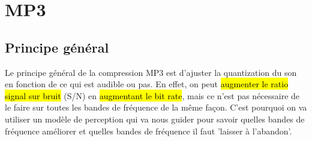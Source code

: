 \documentclass[letterpaper, 12pt]{article}
\newcommand{\alinea}{
\hspace*{0.5cm}}
\begin{document}
	\section{MP3}
		\subsection{Principe général}
			\alinea Le principe général de la compression MP3 est d'ajuster la quantization du son en fonction de ce qui est 
				audible ou pas. En effet, on peut\hl{ augmenter le ratio signal sur bruit} (S/N) en \hl{augmentant le bit rate},
				mais ce n'est pas nécessaire de le faire sur toutes les bandes de fréquence de la même fa\c con. C'est pourquoi
				on va utiliser un modèle de perception qui va nous guider pour savoir quelles bandes de fréquence améliorer et
				quelles bandes de fréquence il faut 'laisser à l'abandon'.
\end{document}
